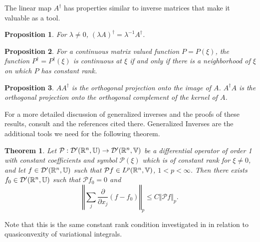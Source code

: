 \documentclass{amsart}
\newtheorem{theorem}{Theorem}[section]
\newtheorem{prop}[prop]{Proposition}
\theoremstyle{definition}
\numberwithin{equation}{section}
\begin{document}
The linear map $A^\dagger$ has properties similar to inverse matrices that make it valuable as a tool.
\begin{prop}For ${\lambda}\neq 0$, $({\lambda} A)^\dagger = {\lambda}^{-1} A^\dagger$.\end{prop}
\begin{prop}For a continuous matrix valued function $P=P(\xi)$, the function $P^\dagger = P^\dagger(\xi)$ is continuous at $\xi$ if and only if there is a neighborhood of $\xi$ on which $P$ has constant rank.\end{prop}
\begin{prop}$AA^\dagger$ is the orthogonal projection onto the image of $A$.  $A^\dagger A$ is the orthogonal projection onto the orthogonal complement of the kernel of $A$.\end{prop}

For a more detailed discussion of generalized inverses and the proofs of these results, consult \cite{Campbell_Meyer79} and the references cited there.
Generalized Inverses are the additional tools we need for the following theorem.
\begin{theorem}\label{gen_inv}Let ${\mathcal{P}}:{\mathcal{D}}'(\Bbb R^n, {\mathbb{U}}) \to {\mathcal{D}}'(\Bbb R^n, {\mathbb{V}})$ be a differential operator of order 1 with constant coefficients and symbol ${\mathcal{P}}(\xi)$ which is of constant rank for $\xi\neq 0$, and let $f \in {\mathcal{D}}'(\Bbb R^n, {\mathbb{U}})$ such that ${\mathcal{P}} f\in L^p(\Bbb R^n, {\mathbb{V}})$, $1<p<\infty$.  Then there exists $f_0 \in {\mathcal{D}}'(\Bbb R^n, {\mathbb{U}})$ such that ${\mathcal{P}} f_0=0$ and $${\left\Vert{\sum_j \frac {\partial}{\partial x_j} \left(f-f_0\right)}\right\Vert}_{p} \leq C {\left\Vert{{\mathcal{P}} f}\right\Vert}_p.$$
\end{theorem}

Note that this is the same constant rank condition investigated in \cite{FonsecaMuller99} in relation to quasiconvexity of variational integrals.
\end{document}
